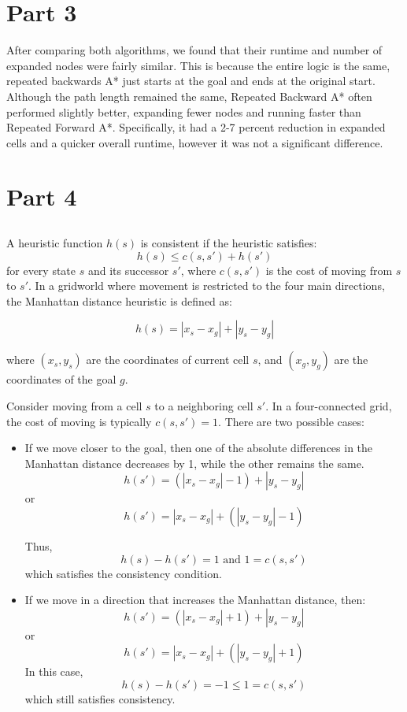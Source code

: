 \documentclass{article}
\begin{document}
\section{Part 3}
After comparing both algorithms, we found that their runtime and number of expanded nodes were fairly similar. This is because the entire logic is the same, repeated backwards A* just starts at the goal and ends at the original start. Although the path length remained the same, Repeated Backward A* often performed slightly better, expanding fewer nodes and running faster than Repeated Forward A*. Specifically, it had a 2-7 percent reduction in expanded cells and a quicker overall runtime, however it was not a significant difference.

\section{Part 4}

\subsection{}

A heuristic function $h(s)$ is consistent if the heuristic satisfies:
\[ h(s) \leq c(s, s') + h(s') \]
for every state $s$ and its successor $s'$, where $c(s, s')$ is the cost of moving from $s$ to $s'$. In a gridworld where movement is restricted to the four main directions, the Manhattan distance heuristic is defined as:

   \[h(s) = |x_s - x_g| + |y_s - y_g| \] 

where $(x_s, y_s)$ are the coordinates of current cell $s$, and $(x_g, y_g)$ are the coordinates of the goal $g$.

Consider moving from a cell $s$ to a neighboring cell $s'$. In a four-connected grid, the cost of moving is typically $c(s, s') = 1$. There are two possible cases:

\begin{itemize}
    \item If we move closer to the goal, then one of the absolute differences in the Manhattan distance decreases by 1, while the other remains the same.
    \[ h(s') = (|x_s - x_g| - 1) + |y_s - y_g| \]
    or
    \[ h(s') = |x_s - x_g| + (|y_s - y_g| - 1) \]
    
    Thus,
    \[ h(s) - h(s') = 1 \text{ and } 1 = c(s, s')\]
    which satisfies the consistency condition.
    
    \item If we move in a direction that increases the Manhattan distance, then:
    \[ h(s') = (|x_s - x_g| + 1) + |y_s - y_g| \]
    or
    \[h(s') = |x_s - x_g| + (|y_s - y_g| + 1)\]
    In this case,
    \[h(s) - h(s') = -1 \leq 1 = c(s, s')\]
    which still satisfies consistency.
\end{itemize}
\end{document}
